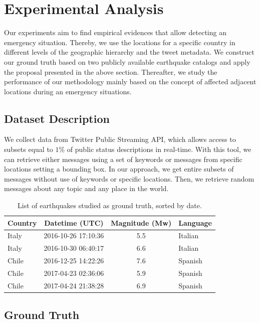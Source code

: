 \documentclass[sigconf]{acmart}
\begin{document}
\section{Experimental Analysis}

Our experiments aim to find empirical evidences that allow detecting an emergency situation. Thereby, we use the locations for a specific country in different levels of the geographic hierarchy and the tweet metadata. We construct our ground truth based on two publicly available earthquake catalogs and apply the proposal presented in the above section. Thereafter, we study the performance of our methodology mainly based on the concept of affected adjacent locations during an emergency situations.

\subsection{Dataset Description}

We collect data from Twitter Public Streaming API, which allows access to subsets equal to $1\%$ of public status descriptions in real-time. With this tool, we can retrieve either messages using a set of keywords or messages from specific locations setting a bounding box. In our approach, we get entire subsets of messages without use of keywords or specific locations. Then, we retrieve random messages about any topic and any place in the world.
 
 \begin{table}
 	\caption{List of earthquakes studied as ground truth, sorted by date.}
 	\label{tab:eqs}
 	\begin{tabular}{lccl}
 		\toprule
 		Country&Datetime (UTC)&Magnitude (Mw)& Language\\
 		\midrule
 		Italy & 2016-10-26 17:10:36 & 5.5 & Italian \\
 		Italy & 2016-10-30 06:40:17 & 6.6 & Italian\\
 		Chile & 2016-12-25 14:22:26 & 7.6 & Spanish\\
 		Chile & 2017-04-23 02:36:06 & 5.9 & Spanish\\
 		Chile & 2017-04-24 21:38:28 & 6.9 & Spanish\\
 		\midrule
 	\end{tabular}
 \end{table}
 
 
\subsection{Ground Truth}
\end{document}
